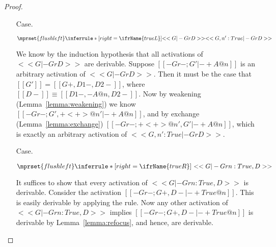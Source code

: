 \begin{proof}
\begin{itemize}
  \item[Case.]\ \\ 
    \begin{center}
      \begin{math}
        $$\mprset{flushleft}
        \inferrule* [right=\ifrName{trueL}] {
          <<G |- Gr D>>
        }{<<G , n' : True |- Gr D>>}
      \end{math}
    \end{center}
    We know by the induction hypothesis that all activations of $<<G |- Gr D>>$
    are derivable.  Suppose $[[-Gr- ; G' |- + A @ n]]$ is an arbitrary
    activation of $<<G |- Gr D>>$.  Then it must be the case that $[[G']] = [[{G}+,{D1}-,{D2}-]]$, where
    $[[{D}-]] \equiv [[{D1}-,-A@n,{D2}-]]$.  Now by weakening (Lemma~\ref{lemma:weakening}) we know 
    $[[-Gr- ; G', + < + > @ n' |- + A @ n]]$, and by exchange (Lemma~\ref{lemma:exchange})
    $[[-Gr- ; + < + > @ n', G' |- + A @ n]]$, which is exactly an arbitrary activation of
    $<<G , n' : True |- Gr D>>$.

  \item[Case.]\ \\ 
    \begin{center}
      \begin{math}
        $$\mprset{flushleft}
        \inferrule* [right=\ifrName{trueR}] {
          \ 
        }{<<G |- Gr n : True, D>>}
      \end{math}
    \end{center}
    It suffices to show that every activation of $<<G |- Gr n : True, D>>$ is derivable.
    Consider the activation $[[-Gr- ; {G}+ , {D}- |- + {True} @ n]]$.  This is easily derivable
    by applying the \ifrName{unit} rule.  Now any other activation of
    $<<G |- Gr n : True, D>>$ 
    implies $[[-Gr- ; {G}+ , {D}- |- + {True} @ n]]$ is derivable by Lemma~\ref{lemma:refocus}, and hence,
    are derivable.



\end{itemize}
\end{proof}
